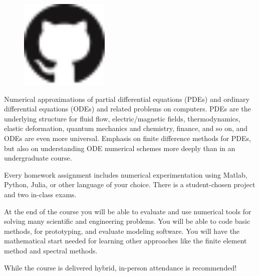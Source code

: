 \documentclass[12pt]{amsart}
\begin{document}
\begin{figure}
  \centering
    \includegraphics[width=0.38\textwidth]{../../images/GitHub-Mark-32px.png}
\end{figure}

Numerical approximations of partial differential equations (PDEs) and ordinary differential equations (ODEs) and related problems on computers.  PDEs are the underlying structure for fluid flow, electric/magnetic fields, thermodynamics, elastic deformation, quantum mechanics and chemistry, finance, and so on, and ODEs are even more universal.  Emphasis on finite difference methods for PDEs, but also on understanding ODE numerical schemes more deeply than in an undergraduate course.

\smallskip
Every homework assignment includes numerical experimentation using Matlab, Python, Julia, or other language of your choice.  There is a student-chosen project and two
in-class exams.

\smallskip
At the end of the course you will be able to evaluate and use numerical tools for solving many scientific and engineering problems.  You will be able to code basic methods, for prototyping, and evaluate modeling software.  You will have the mathematical start needed for learning other approaches like the finite element method and spectral methods.

\smallskip
While the course is delivered hybrid, in-person attendance is recommended!
\end{document}
